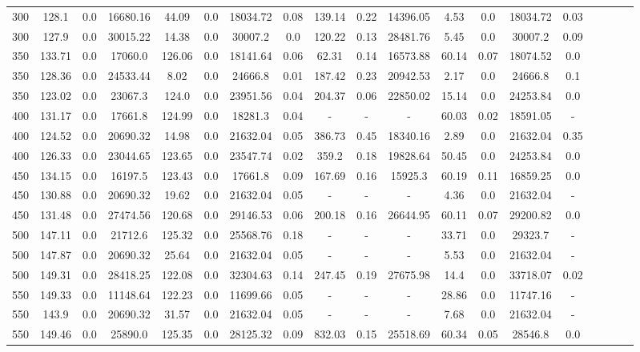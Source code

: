 \begin{sidewaystable}[!h]
\begin{tabular}{lcccccccccccccccccc}
300 & 128.1 & 0.0 & 16680.16 & 44.09 & 0.0 & 18034.72 & 0.08 & 139.14 & 0.22 & 14396.05 & 4.53 & 0.0 & 18034.72 & 0.03 \\
300 & 127.9 & 0.0 & 30015.22 & 14.38 & 0.0 & 30007.2 & 0.0 & 120.22 & 0.13 & 28481.76 & 5.45 & 0.0 & 30007.2 & 0.09 \\
350 & 133.71 & 0.0 & 17060.0 & 126.06 & 0.0 & 18141.64 & 0.06 & 62.31 & 0.14 & 16573.88 & 60.14 & 0.07 & 18074.52 & 0.0 \\
350 & 128.36 & 0.0 & 24533.44 & 8.02 & 0.0 & 24666.8 & 0.01 & 187.42 & 0.23 & 20942.53 & 2.17 & 0.0 & 24666.8 & 0.1 \\
350 & 123.02 & 0.0 & 23067.3 & 124.0 & 0.0 & 23951.56 & 0.04 & 204.37 & 0.06 & 22850.02 & 15.14 & 0.0 & 24253.84 & 0.0 \\
400 & 131.17 & 0.0 & 17661.8 & 124.99 & 0.0 & 18281.3 & 0.04 & - & - & - & 60.03 & 0.02 & 18591.05 &  - \\
400 & 124.52 & 0.0 & 20690.32 & 14.98 & 0.0 & 21632.04 & 0.05 & 386.73 & 0.45 & 18340.16 & 2.89 & 0.0 & 21632.04 & 0.35 \\
400 & 126.33 & 0.0 & 23044.65 & 123.65 & 0.0 & 23547.74 & 0.02 & 359.2 & 0.18 & 19828.64 & 50.45 & 0.0 & 24253.84 & 0.0 \\
450 & 134.15 & 0.0 & 16197.5 & 123.43 & 0.0 & 17661.8 & 0.09 & 167.69 & 0.16 & 15925.3 & 60.19 & 0.11 & 16859.25 & 0.0 \\
450 & 130.88 & 0.0 & 20690.32 & 19.62 & 0.0 & 21632.04 & 0.05 & - & - & - & 4.36 & 0.0 & 21632.04 &  - \\
450 & 131.48 & 0.0 & 27474.56 & 120.68 & 0.0 & 29146.53 & 0.06 & 200.18 & 0.16 & 26644.95 & 60.11 & 0.07 & 29200.82 & 0.0 \\
500 & 147.11 & 0.0 & 21712.6 & 125.32 & 0.0 & 25568.76 & 0.18 & - & - & - & 33.71 & 0.0 & 29323.7 &  - \\
500 & 147.87 & 0.0 & 20690.32 & 25.64 & 0.0 & 21632.04 & 0.05 & - & - & - & 5.53 & 0.0 & 21632.04 &  - \\
500 & 149.31 & 0.0 & 28418.25 & 122.08 & 0.0 & 32304.63 & 0.14 & 247.45 & 0.19 & 27675.98 & 14.4 & 0.0 & 33718.07 & 0.02 \\
550 & 149.33 & 0.0 & 11148.64 & 122.23 & 0.0 & 11699.66 & 0.05 & - & - & - & 28.86 & 0.0 & 11747.16 &  - \\
550 & 143.9 & 0.0 & 20690.32 & 31.57 & 0.0 & 21632.04 & 0.05 & - & - & - & 7.68 & 0.0 & 21632.04 &  - \\
550 & 149.46 & 0.0 & 25890.0 & 125.35 & 0.0 & 28125.32 & 0.09 & 832.03 & 0.15 & 25518.69 & 60.34 & 0.05 & 28546.8 & 0.0 \\

\end{tabular}
\end{sidewaystable}
